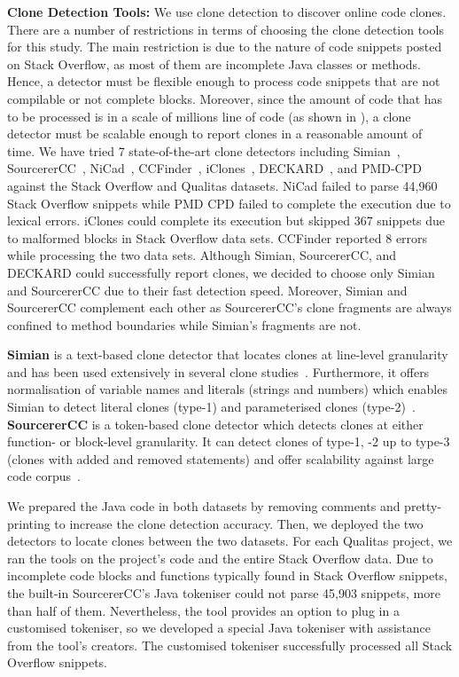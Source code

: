 \documentclass[10pt,journal,compsoc]{IEEEtran}
\begin{document}
\textbf{Clone Detection Tools: } We use clone detection to discover online code
clones. %
There are a number of restrictions in terms of choosing the clone detection
tools for this study. The main restriction is due to the nature of code snippets
posted on Stack Overflow, as most of them are incomplete Java classes or
methods. Hence, a detector must be flexible enough to process code snippets that
are not compilable or not complete blocks. Moreover, since the amount of code
that has to be processed is in a scale of millions line of code (as shown in
), a clone detector must be scalable enough to report clones
in a reasonable amount of time. We have tried 7 state-of-the-art clone detectors
including Simian~\cite{simian}, SourcererCC~\cite{Sajnani2016},
NiCad~\cite{Cordy,Roy2008}, CCFinder~\cite{Kamiya2002}, iClones~\cite{Gode2009},
DECKARD~\cite{Jiang2007a}, and PMD-CPD~\cite{pmd-cpd} against the Stack Overflow
and Qualitas datasets. NiCad failed to parse 44,960 Stack Overflow snippets
while PMD CPD failed to complete the execution due to lexical errors. iClones
could complete its execution but skipped 367 snippets due to malformed blocks in
Stack Overflow data sets. CCFinder reported 8 errors while processing the two data sets. 
Although Simian, SourcererCC, and DECKARD
could successfully report clones, we decided to choose only Simian and
SourcererCC due to their fast detection speed. Moreover, Simian and
SourcererCC complement each other as SourcererCC's clone fragments are
always confined to method boundaries while Simian's fragments are not.

\textbf{Simian} is a text-based clone detector that locates clones at line-level
granularity and has been used extensively in several clone
studies~\cite{Ragkhitwetsagul2016, emse, Wang2013, Mondal2011, Cheung2015,
  krinke11cloned, Krinke2010, krinke10distinguishing, Krinke2008,
  krinke07study, ragkhitwetsagul18picture}. Furthermore, it offers normalisation of variable names and literals
(strings and numbers) which enables Simian to detect literal clones (type-1) and
parameterised clones (type-2)~\cite{Bellon2007}. \textbf{SourcererCC} is a token-based clone
detector which detects clones at either function- or block-level granularity. It
can detect clones of type-1, -2 up to type-3 (clones with added and removed
statements) and offer scalability against large code
corpus~\cite{Sajnani2016,Saini2016,Yang2017}. 

We prepared the Java code in both datasets by removing comments and
pretty-printing to increase the clone detection accuracy. Then, we deployed the
two detectors to locate clones between the two datasets.  For each Qualitas
project, we ran the tools on the project's code and the entire Stack Overflow
data. Due to incomplete code blocks and functions
typically found in Stack Overflow snippets, the built-in SourcererCC's Java
tokeniser could not parse 45,903 snippets, more than half of them. Nevertheless,
the tool provides an option to plug in a customised tokeniser, so we developed a
special Java tokeniser with assistance from the tool's creators. The customised
tokeniser successfully processed all Stack Overflow snippets.
\end{document}
